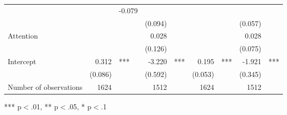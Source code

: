 \documentclass{article}
\begin{document}
\begin{table}[!h]
\begin{tabular}{lllllllll}
  \multicolumn{1}{r}{} &
  \multicolumn{1}{l}{} &
  \multicolumn{1}{r}{-0.079} &
  \multicolumn{1}{l}{} \\
\multicolumn{1}{l}{} &
  \multicolumn{1}{r}{} &
  \multicolumn{1}{l}{} &
  \multicolumn{1}{r}{(0.094)} &
  \multicolumn{1}{l}{} &
  \multicolumn{1}{r}{} &
  \multicolumn{1}{l}{} &
  \multicolumn{1}{r}{(0.057)} &
  \multicolumn{1}{l}{} \\
\multicolumn{1}{l}{Attention} &
  \multicolumn{1}{r}{} &
  \multicolumn{1}{l}{} &
  \multicolumn{1}{r}{0.028} &
  \multicolumn{1}{l}{} &
  \multicolumn{1}{r}{} &
  \multicolumn{1}{l}{} &
  \multicolumn{1}{r}{0.028} &
  \multicolumn{1}{l}{} \\
\multicolumn{1}{l}{} &
  \multicolumn{1}{r}{} &
  \multicolumn{1}{l}{} &
  \multicolumn{1}{r}{(0.126)} &
  \multicolumn{1}{l}{} &
  \multicolumn{1}{r}{} &
  \multicolumn{1}{l}{} &
  \multicolumn{1}{r}{(0.075)} &
  \multicolumn{1}{l}{} \\
\multicolumn{1}{l}{Intercept} &
  \multicolumn{1}{r}{0.312} &
  \multicolumn{1}{l}{***} &
  \multicolumn{1}{r}{-3.220} &
  \multicolumn{1}{l}{***} &
  \multicolumn{1}{r}{0.195} &
  \multicolumn{1}{l}{***} &
  \multicolumn{1}{r}{-1.921} &
  \multicolumn{1}{l}{***} \\
\multicolumn{1}{l}{} &
  \multicolumn{1}{r}{(0.086)} &
  \multicolumn{1}{l}{} &
  \multicolumn{1}{r}{(0.592)} &
  \multicolumn{1}{l}{} &
  \multicolumn{1}{r}{(0.053)} &
  \multicolumn{1}{l}{} &
  \multicolumn{1}{r}{(0.345)} &
  \multicolumn{1}{l}{} \\
\multicolumn{1}{l}{Number of observations} &
  \multicolumn{1}{r}{1624} &
  \multicolumn{1}{l}{} &
  \multicolumn{1}{r}{1512} &
  \multicolumn{1}{l}{} &
  \multicolumn{1}{r}{1624} &
  \multicolumn{1}{l}{} &
  \multicolumn{1}{r}{1512} &
  \multicolumn{1}{l}{} \\
\cline{1-9}
\end{tabular}

\footnotesize{
*** p$<$.01, ** p$<$.05, * p$<$.1
}
\end{table}
\end{document}
